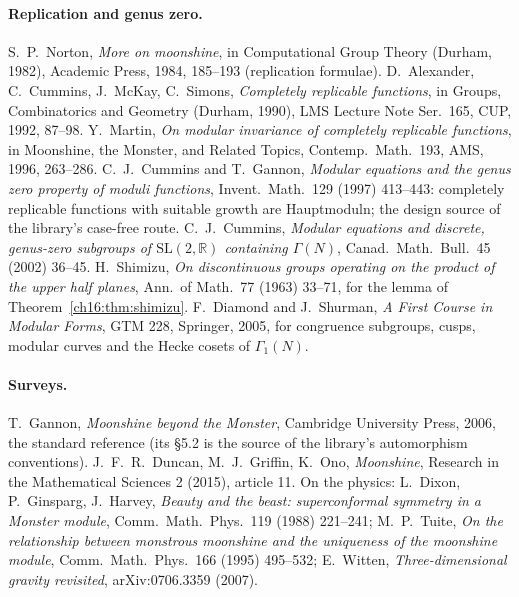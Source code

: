 \paragraph{Replication and genus zero.}  S.~P.~Norton, \emph{More on moonshine}, in Computational Group Theory
(Durham, 1982), Academic Press, 1984, 185--193 (replication formulae).  D.~Alexander, C.~Cummins, J.~McKay, C.~Simons,
\emph{Completely replicable functions}, in Groups, Combinatorics and Geometry (Durham, 1990), LMS Lecture Note Ser.\
165, CUP, 1992, 87--98.  Y.~Martin, \emph{On modular invariance of completely replicable functions}, in Moonshine, the
Monster, and Related Topics, Contemp.\ Math.\ 193, AMS, 1996, 263--286.  C.~J.~Cummins and T.~Gannon, \emph{Modular
equations and the genus zero property of moduli functions}, Invent.\ Math.\ 129 (1997) 413--443: completely
replicable functions with suitable growth are Hauptmoduln; the design source of the library's case-free route.
C.~J.~Cummins, \emph{Modular equations and discrete, genus-zero subgroups of $\mathrm{SL}(2,\mathbb R)$ containing
$\Gamma(N)$}, Canad.\ Math.\ Bull.\ 45 (2002) 36--45.  H.~Shimizu, \emph{On discontinuous groups operating on the product
of the upper half planes}, Ann.\ of Math.\ 77 (1963) 33--71, for the lemma of Theorem~\ref{ch16:thm:shimizu}.  F.~Diamond
and J.~Shurman, \emph{A First Course in Modular Forms}, GTM 228, Springer, 2005, for congruence subgroups, cusps,
modular curves and the Hecke cosets of $\Gamma_1(N)$.

\paragraph{Surveys.}  T.~Gannon, \emph{Moonshine beyond the Monster}, Cambridge University Press, 2006, the standard
reference (its \S5.2 is the source of the library's automorphism conventions).  J.~F.~R.~Duncan, M.~J.~Griffin,
K.~Ono, \emph{Moonshine}, Research in the Mathematical Sciences 2 (2015), article 11.  On the physics: L.~Dixon,
P.~Ginsparg, J.~Harvey, \emph{Beauty and the beast: superconformal symmetry in a Monster module}, Comm.\ Math.\ Phys.\
119 (1988) 221--241; M.~P.~Tuite, \emph{On the relationship between monstrous moonshine and the uniqueness of the
moonshine module}, Comm.\ Math.\ Phys.\ 166 (1995) 495--532; E.~Witten, \emph{Three-dimensional gravity revisited},
arXiv:0706.3359 (2007).

